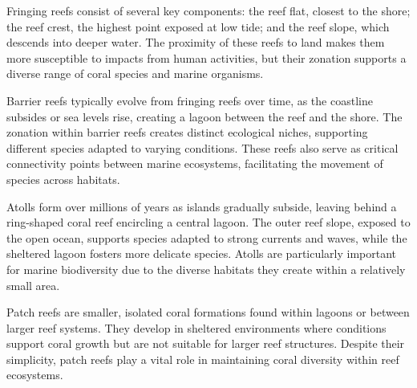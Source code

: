 Fringing reefs consist of several key components: the reef flat, closest to the shore; the reef crest, the highest point exposed at low tide; and the reef slope, which descends into deeper water. The proximity of these reefs to land makes them more susceptible to impacts from human activities, but their zonation supports a diverse range of coral species and marine organisms.


Barrier reefs typically evolve from fringing reefs over time, as the coastline subsides or sea levels rise, creating a lagoon between the reef and the shore. The zonation within barrier reefs creates distinct ecological niches, supporting different species adapted to varying conditions. These reefs also serve as critical connectivity points between marine ecosystems, facilitating the movement of species across habitats.


Atolls form over millions of years as islands gradually subside, leaving behind a ring-shaped coral reef encircling a central lagoon. The outer reef slope, exposed to the open ocean, supports species adapted to strong currents and waves, while the sheltered lagoon fosters more delicate species. Atolls are particularly important for marine biodiversity due to the diverse habitats they create within a relatively small area.


Patch reefs are smaller, isolated coral formations found within lagoons or between larger reef systems. They develop in sheltered environments where conditions support coral growth but are not suitable for larger reef structures. Despite their simplicity, patch reefs play a vital role in maintaining coral diversity within reef ecosystems. 


